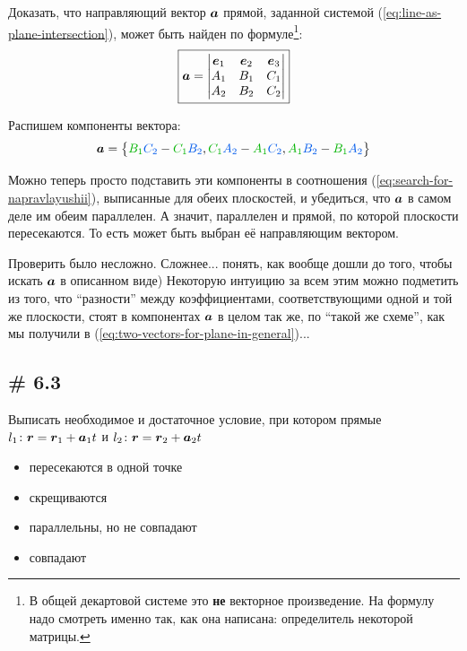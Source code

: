 \documentclass[a4paper,12pt]{article}
\begin{document}
  \begin{problem}
    Доказать, что направляющий вектор $\boldsymbol a$ прямой, заданной системой (\ref{eq:line-as-plane-intersection}), может быть найден по формуле\footnote{В общей декартовой системе это \textbf{не} векторное произведение. На формулу надо смотреть именно так, как она написана: определитель некоторой матрицы.}:
    \begin{equation}\label{eq:parallel-for-line-as-intersection}
      \boxed{
        \boldsymbol a = \begin{vmatrix}
          \boldsymbol e_1 & \boldsymbol e_2 & \boldsymbol e_3\\
          A_1      & B_1      & C_1\\
          A_2      & B_2      & C_2
        \end{vmatrix}
      }
    \end{equation}
  \end{problem}
  
  \begin{solution}
    Распишем компоненты вектора:
    \[
      \bds a = \bigl\{
        \textcolor{my-green}{B_1} \textcolor{my-blue}{C_2} - \textcolor{my-green}{C_1} \textcolor{my-blue}{B_2},
        \textcolor{my-green}{C_1} \textcolor{my-blue}{A_2} - \textcolor{my-green}{A_1} \textcolor{my-blue}{C_2},
        \textcolor{my-green}{A_1} \textcolor{my-blue}{B_2} - \textcolor{my-green}{B_1} \textcolor{my-blue}{A_2}
      \bigr\}
    \]
    
    Можно теперь просто подставить эти компоненты в соотношения (\ref{eq:search-for-napravlayushii}), выписанные для обеих плоскостей, и убедиться, что $\boldsymbol a$ в самом деле им обеим параллелен.
    А значит, параллелен и прямой, по которой плоскости пересекаются.
    То есть может быть выбран её направляющим вектором.
    
    Проверить было несложно.
    Сложнее... понять, как вообще дошли до того, чтобы искать $\boldsymbol a$ в описанном виде)
    Некоторую интуицию за всем этим можно подметить из того, что ``разности'' между коэффициентами, соответствующими одной и той же плоскости, стоят в компонентах $\boldsymbol a$ в целом так же, по ``такой же схеме'', как мы получили в (\ref{eq:two-vectors-for-plane-in-general})...
  \end{solution}
  
  
  \subsection{\# 6.3}
  
  \begin{problem}
    Выписать необходимое и достаточное условие, при котором прямые
    $
      l_1\colon \bds r \hm= \bds r_1 \hm+ \bds a_1 t
    $ и
    $
      l_2\colon \bds r \hm= \bds r_2 \hm+ \bds a_2 t
    $
    \begin{itemize}
      \item пересекаются в одной точке
      \item скрещиваются
      \item параллельны, но не совпадают
      \item совпадают
    \end{itemize}
  \end{problem}
  
\end{document}
